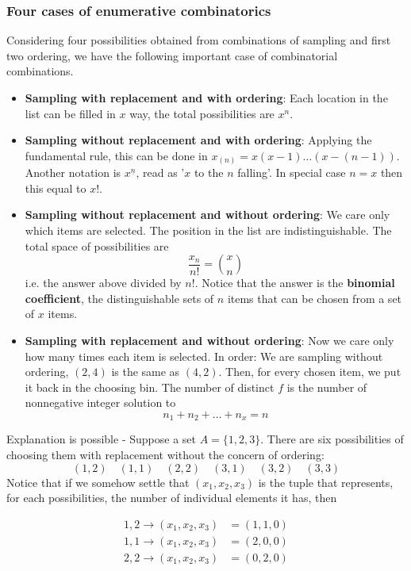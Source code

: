 \subsubsection{Four cases of enumerative combinatorics}
Considering four possibilities obtained from combinations of sampling and first two ordering, we have the following important case of combinatorial combinations. 
\begin{itemize}[noitemsep,topsep=0pt]
    \item \textbf{Sampling with replacement and with ordering}: Each location in the list can be filled in $x$ way, the total possibilities are $x^{n}$. 
    \item \textbf{Sampling without replacement and with ordering}: Applying the fundamental rule, this can be done in $x_{(n)} =x(x-1)\dots(x-(n-1))$. Another notation is $x^{\underline{n}}$, read as '$x$ to the $n$ falling'. In special case $n=x$ then this equal to $x!$. 
    \item \textbf{Sampling without replacement and without ordering}: We care only which items are selected. The position in the list are indistinguishable. The total space of possibilities are $$\frac{x_{n}}{n!}= {x \choose n}$$ i.e. the answer above divided by $n!$. Notice that the answer is the \textbf{binomial coefficient}, the distinguishable sets of $n$ items that can be chosen from a set of $x$ items. 
    \item \textbf{Sampling with replacement and without ordering}: Now we care only how many times each item is selected. In order: We are sampling without ordering, $(2,4)$ is the same as $(4,2)$. Then, for every chosen item, we put it back in the choosing bin. The number of distinct $f$ is the number of nonnegative integer solution to $$n_{1}+n_{2}+\dots+n_{x}=n$$
\end{itemize}
Explanation is possible - Suppose a set $A=\{ 1,2,3 \}$. There are six possibilities of choosing them with replacement without the concern of ordering: 
\begin{equation}
\left(1,2\right) \quad \left(1,1\right) \quad \left(2,2\right) \quad \left(3,1\right) \quad \left(3,2\right) \quad \left(3,3\right)
\end{equation}
Notice that if we somehow settle that $(x_{1},x_{2},x_{3})$ is the tuple that represents, for each possibilities, the number of individual elements it has, then 

\begin{equation*}
    \begin{split}
        1,2 \to (x_{1},x_{2},x_{3}) & = (1,1,0)\\
        1,1 \to (x_{1},x_{2},x_{3}) & = (2,0,0)\\
        2,2 \to (x_{1},x_{2},x_{3}) & = (0,2,0)
        \end{split}
\end{equation*}

